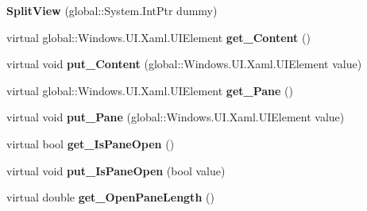 \begin{DoxyCompactItemize}
{\bfseries Split\+View} (global\+::\+System.\+Int\+Ptr dummy)
\item 
\mbox{\label{class_windows_1_1_u_i_1_1_xaml_1_1_controls_1_1_split_view_a8e8c81d98be4733b9d0e0c12f077d2ab}} 
virtual global\+::\+Windows.\+U\+I.\+Xaml.\+U\+I\+Element {\bfseries get\+\_\+\+Content} ()
\item 
\mbox{\label{class_windows_1_1_u_i_1_1_xaml_1_1_controls_1_1_split_view_a858c49c1b29c83b8d2256306a2311f25}} 
virtual void {\bfseries put\+\_\+\+Content} (global\+::\+Windows.\+U\+I.\+Xaml.\+U\+I\+Element value)
\item 
\mbox{\label{class_windows_1_1_u_i_1_1_xaml_1_1_controls_1_1_split_view_a6c58d7776daf88d1bd3c41ac7d058eaa}} 
virtual global\+::\+Windows.\+U\+I.\+Xaml.\+U\+I\+Element {\bfseries get\+\_\+\+Pane} ()
\item 
\mbox{\label{class_windows_1_1_u_i_1_1_xaml_1_1_controls_1_1_split_view_a8c4b09d201319f93f6bc55c355264db6}} 
virtual void {\bfseries put\+\_\+\+Pane} (global\+::\+Windows.\+U\+I.\+Xaml.\+U\+I\+Element value)
\item 
\mbox{\label{class_windows_1_1_u_i_1_1_xaml_1_1_controls_1_1_split_view_a0f921a26afd4e2d74579c00a1ab97dee}} 
virtual bool {\bfseries get\+\_\+\+Is\+Pane\+Open} ()
\item 
\mbox{\label{class_windows_1_1_u_i_1_1_xaml_1_1_controls_1_1_split_view_ab5edefa99b08ffbc412d0e00aa5b531c}} 
virtual void {\bfseries put\+\_\+\+Is\+Pane\+Open} (bool value)
\item 
\mbox{\label{class_windows_1_1_u_i_1_1_xaml_1_1_controls_1_1_split_view_a854842b7daf878725df6c255d01fc31e}} 
virtual double {\bfseries get\+\_\+\+Open\+Pane\+Length} ()
\item 
\mbox{\label{class_windows_1_1_u_i_1_1_xaml_1_1_controls_1_1_split_view_a5fbb9c9badd343958b2257ca2eb5a0f2}} 

\end{DoxyCompactItemize}
